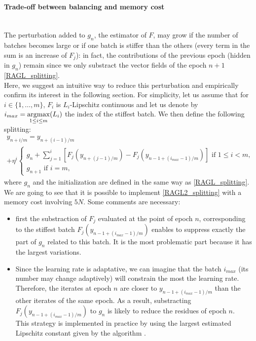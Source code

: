 \paragraph{Trade-off between balancing and memory cost}
~~\\
The perturbation added to $g_n$, the estimator of $F$, may grow if the number of batches becomes large or if one batch is stiffer than the others (every term in the sum is an increase of $F_j$): in fact, the contributions of the previous epoch (hidden in $g_n$) remain since we only substract the vector fields of the epoch $n+1$ \eqref{RAGL_splitting}. \\ 
Here, we suggest an intuitive way to reduce this perturbation and empirically confirm its interest in the following section. For simplicity, let us assume that for $i\in \{1,\dots,m\}$, $F_i$ is $L_i$-Lipschitz continuous and let us denote by $i_{max} = \displaystyle{\operatorname*{\arg\!\max}_{1 \leq i \leq m}} (L_i)$ the index of the stiffest batch. We then define the following splitting:
\begin{multline}
	y_{n+i/m} = y_{n+(i-1)/m} \\
	+\eta^i
	\left\{
	\begin{array}{ll}
		g_n+\displaystyle{\sum_{j=1}^i} \left[F_j\left(y_{n+(j-1)/m}\right)-F_j\left(y_{n-1+(i_{max}-1)/m}\right)\right] \text{ if } 1\leq i<m,\\
		g_{n+1} \text{ if } i=m,
	\end{array}
	\right.
	\label{RAGL2_splitting}
\end{multline}
where $g_n$ and the initialization are defined in the same way as \eqref{RAGL_splitting}. We are going to see that it is possible to implement \eqref{RAGL2_splitting} with a memory cost involving $5N$.
Some comments are necessary:
\begin{itemize}
	\item first the substraction of $F_j$ evaluated at the point of epoch $n$, corresponding to the stiffest batch $F_j\left(y_{n-1+(i_{max}-1)/m}\right)$ enables to suppress exactly the part of $g_n$ related to this batch. It is the most problematic part because it has the largest variations.
        \item Since the learning rate is adaptative, we can imagine that the batch $i_{max}$ (its number may change adaptively) will constrain the most the learning rate. Therefore, the
          iterates at epoch $n$ are closer to $y_{n-1+(i_{max}-1)/m}$ than the other iterates of the same epoch. As a result, substracting $F_j\left(y_{n-1+(i_{max}-1)/m}\right)$ to $g_n$ is likely to reduce the residues of epoch $n$. \\
    {This strategy is implemented in practice by using the largest estimated Lipschitz constant given by the algorithm .}
\end{itemize} 



